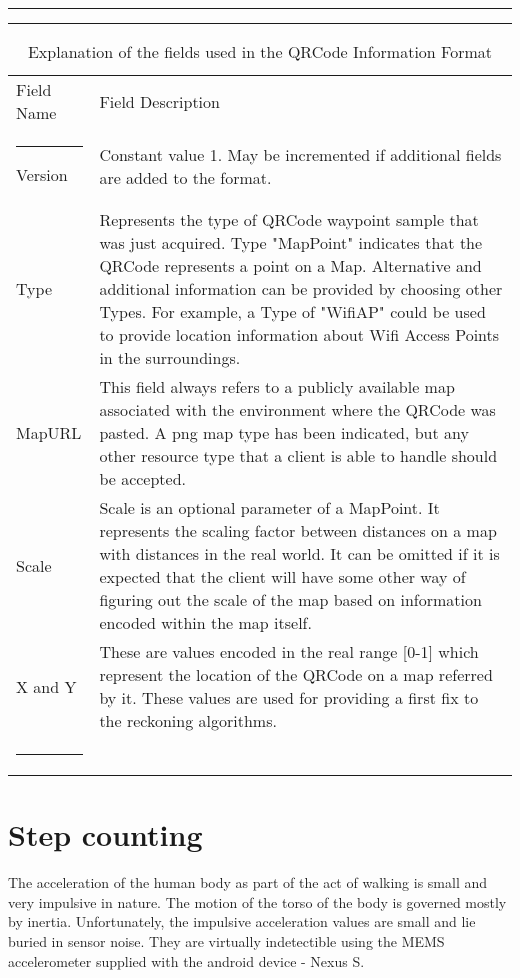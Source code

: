 \begin{table}
\centering
\hrule
\hrule
\begin{tabular}{p{1.5in} p{4.5in}}
Field Name      &       Field Description \\
\hrule
Version         & Constant value 1. May be incremented if additional fields are added to the format. \\
Type            & Represents the type of QRCode waypoint sample that was just acquired. Type "MapPoint"
                    indicates that the QRCode represents a point on a Map. Alternative and 
                    additional information can be provided by choosing other Types. For example, 
                    a Type of "WifiAP" could be used to provide location information about 
                    Wifi Access Points in the surroundings. \\
MapURL          & This field always refers to a publicly available map associated with the environment where 
                    the QRCode was pasted. A png map type has been indicated, but any other resource type that 
                    a client is able to handle should be accepted. \\
Scale           & Scale is an optional parameter of a MapPoint. It represents the scaling factor between distances
                    on a map with distances in the real world. It can be omitted if it is expected that the 
                    client will have some other way of figuring out the scale of the map based on information
                    encoded within the map itself. \\
X and Y         & These are values encoded in the real range [0-1] which represent the location of the QRCode
                    on a map referred by it. These values are used for providing a first fix to the 
                    reckoning algorithms.  \\
\hrule
\end{tabular}
\caption{Explanation of the fields used in the QRCode Information Format\label{tbl:QRCode_fields_table}}
\end{table}


\section{Step counting}

The acceleration of the human body as part of the act of walking is small and 
very impulsive in nature. The motion of the torso of the body is governed 
mostly by inertia. Unfortunately, the impulsive acceleration values are small 
and lie buried in sensor noise. They are virtually indetectible using the MEMS 
accelerometer supplied with the android device - Nexus S.

